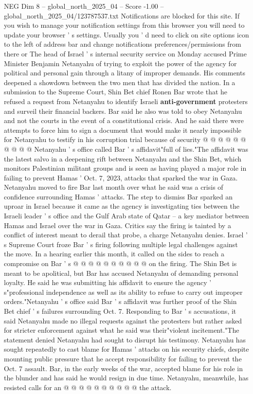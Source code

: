\begin{textsample}{NEG Dim 8 – global\_north\_2025\_04 – Score -1.00 – global\_north\_2025\_04/123787537.txt}  \label{ex:f8_neg_424}
Notifications are blocked for this site.
If you wish to manage your notification settings from this browser you will need to update your browser ' s settings.
Usually you ' d need to click on site options icon to the left of address bar and change notifications preferences/permissions from there or The head of Israel ' s internal security service on Monday accused Prime Minister Benjamin Netanyahu of trying to exploit the power of the agency for political and personal gain through a litany of improper demands.
His comments deepened a showdown between the two men that has divided the nation.
In a submission to the Supreme Court, Shin Bet chief Ronen Bar wrote that he refused a request from Netanyahu to identify Israeli \textbf{anti-government} protesters and surveil their financial backers.
Bar said he also was told to obey Netanyahu and not the courts in the event of a constitutional crisis.
And he said there were attempts to force him to sign a document that would make it nearly impossible for Netanyahu to testify in his corruption trial because of security @ @ @ @ @ @ @ @ @ @ Netanyahu ' s office called Bar ' s affidavit"full of lies."The affidavit was the latest salvo in a deepening rift between Netanyahu and the Shin Bet, which monitors Palestinian militant groups and is seen as having played a major role in failing to prevent Hamas ' Oct. 7, 2023, attacks that sparked the war in Gaza.
Netanyahu moved to fire Bar last month over what he said was a crisis of confidence surrounding Hamas ' attacks.
The step to dismiss Bar sparked an uproar in Israel because it came as the agency is investigating ties between the Israeli leader ' s office and the Gulf Arab state of Qatar -- a key mediator between Hamas and Israel over the war in Gaza.
Critics say the firing is tainted by a conflict of interest meant to derail that probe, a charge Netanyahu denies.
Israel ' s Supreme Court froze Bar ' s firing following multiple legal challenges against the move.
In a hearing earlier this month, it called on the sides to reach a compromise on Bar ' s @ @ @ @ @ @ @ @ @ @ on the firing.
The Shin Bet is meant to be apolitical, but Bar has accused Netanyahu of demanding personal loyalty.
He said he was submitting his affidavit to ensure the agency ' s"professional independence as well as its ability to refuse to carry out improper orders."Netanyahu ' s office said Bar ' s affidavit was further proof of the Shin Bet chief ' s failures surrounding Oct. 7.
Responding to Bar ' s accusations, it said Netanyahu made no illegal requests against the protesters but rather asked for stricter enforcement against what he said was their"violent incitement."The statement denied Netanyahu had sought to disrupt his testimony.
Netanyahu has sought repeatedly to cast blame for Hamas ' attacks on his security chiefs, despite mounting public pressure that he accept responsibility for failing to prevent the Oct. 7 assault.
Bar, in the early weeks of the war, accepted blame for his role in the blunder and has said he would resign in due time.
Netanyahu, meanwhile, has resisted calls for an @ @ @ @ @ @ @ @ @ @ the attack.

\end{textsample}
